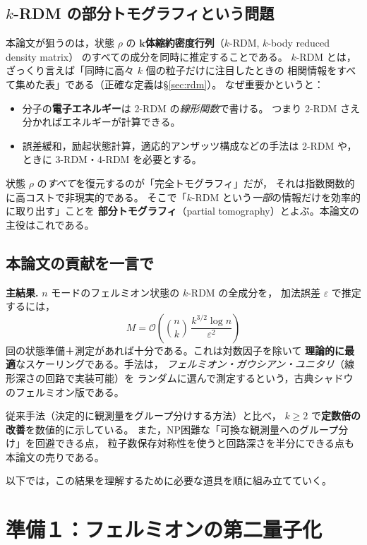 \documentclass[11pt,a4paper]{ltjsarticle}
\theoremstyle{definition}
\theoremstyle{plain}
\begin{document}
\subsection{$k$-RDM の部分トモグラフィという問題}
本論文が狙うのは，状態 $\rho$ の
\textbf{$\bm{k}$体縮約密度行列}（$k$-RDM, $k$-body reduced density matrix）
のすべての成分を同時に推定することである。
$k$-RDM とは，ざっくり言えば「同時に高々 $k$ 個の粒子だけに注目したときの
相関情報をすべて集めた表」である（正確な定義は\S\ref{sec:rdm}）。
なぜ重要かというと：
\begin{itemize}
  \item 分子の\textbf{電子エネルギー}は 2-RDM の\emph{線形関数}で書ける。
        つまり 2-RDM さえ分かればエネルギーが計算できる。
  \item 誤差緩和，励起状態計算，適応的アンザッツ構成などの手法は
        2-RDM や，ときに 3-RDM・4-RDM を必要とする。
\end{itemize}
状態 $\rho$ の\emph{すべて}を復元するのが「完全トモグラフィ」だが，
それは指数関数的に高コストで非現実的である。
そこで「$k$-RDM という\emph{一部}の情報だけを効率的に取り出す」ことを
\textbf{部分トモグラフィ}（partial tomography）とよぶ。本論文の主役はこれである。

\subsection{本論文の貢献を一言で}
\begin{keybox}
\textbf{主結果.}\; $n$ モードのフェルミオン状態の $k$-RDM の全成分を，
加法誤差 $\varepsilon$ で推定するには，
\[
   M=\mathcal{O}\!\left(\binom{n}{k}\,\frac{k^{3/2}\log n}{\varepsilon^2}\right)
\]
回の状態準備＋測定があれば十分である。これは対数因子を除いて
\textbf{理論的に最適}なスケーリングである。手法は，
\emph{フェルミオン・ガウシアン・ユニタリ}（線形深さの回路で実装可能）を
ランダムに選んで測定するという，古典シャドウのフェルミオン版である。
\end{keybox}

従来手法（決定的に観測量をグループ分けする方法）と比べ，
$k\ge 2$ で\textbf{定数倍の改善}を数値的に示している。
また，NP困難な「可換な観測量へのグループ分け」を回避できる点，
粒子数保存対称性を使うと回路深さを半分にできる点も本論文の売りである。

\medskip
以下では，この結果を理解するために必要な道具を順に組み立てていく。

\section{準備１：フェルミオンの第二量子化}
\end{document}
